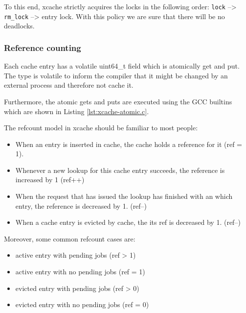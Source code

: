 To this end, xcache strictly acquires the locks in the following order: 
\texttt{lock} --> \texttt{rm\_lock} --> entry lock. With this policy we are 
sure that there will be no deadlocks.

\subsubsection{Reference counting}\label{sec:xcache-refcount-imp}

Each cache entry has a volatile uint64\_t field which is atomically get and 
put. The type is volatile to inform the compiler that it might be changed by an 
external process and therefore not cache it.

Furthermore, the atomic gets and puts are executed using the GCC builtins which 
are shown in Listing \ref{lst:xcache-atomic.c}.


The refcount model in xcache should be familiar to most people:

\begin{itemize}
	\item When an entry is inserted in cache, the cache holds a reference 
		for it (ref = 1).
	\item Whenever a new lookup for this cache entry succeeds, the reference 
		is increased by 1 (ref++)
	\item When the request that has issued the lookup has finished with an 
		which entry, the reference is decreased by 1. (ref--)
	\item When a cache entry is evicted by cache, the its ref is decreased 
		by 1. (ref--)
\end{itemize}

Moreover, some common refcount cases are:

\begin{itemize}
	\item active entry with pending jobs (ref > 1)
	\item active entry with no pending jobs (ref = 1)
	\item evicted entry with pending jobs (ref > 0)
	\item evicted entry with no pending jobs (ref = 0)
\end{itemize}

\begin{comment}
\begin{table}
	\centering
	\begin{tabular}{ | l | l | }
		\hline
		Case & Refcount \\ \hline \hline
		active entry with pending jobs & ref > 1 \\ \hline
		active entry with no pending jobs & ref = 1 \\ \hline
		evicted entry with pending jobs & ref > 0 \\ \hline
		evicted entry with no pending jobs & ref = 0 \\ \hline
	\end{tabular}
	\caption{Reference counting of xcache}
	\label{tab:refcount}
\end{table}
\end{comment}

